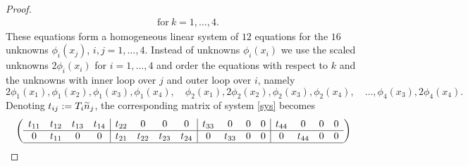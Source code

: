 \documentclass[11pt]{article}
\begin{document}
\begin{proof}
\begin{align}
   \quad\text{for}\ k=1,\ldots,4.
\end{align}
These equations form a homogeneous linear system of $12$ equations for the $16$ unknowns
$\phi_i(x_j)$, $i,j=1,\ldots,4$. Instead of unknowns $\phi_i(x_i)$ we use the scaled unknowns
$2\phi_i(x_i)$ for $i=1,\ldots,4$ and order the equations with respect to $k$ and
the unknowns with inner loop over $j$ and outer loop over $i$, namely
\[
   2\phi_1(x_1), \phi_1(x_2), \phi_1(x_3), \phi_1(x_4),\quad
   \phi_2(x_1), 2\phi_2(x_2), \phi_2(x_3), \phi_2(x_4),\quad\ldots,
   \phi_4(x_3), 2\phi_4(x_4).
\]
Denoting $t_{ij}:=T_i\widetilde n_j$, the corresponding matrix of system \eqref{sys} becomes
\[
   \begin{pmatrix}
   \begin{array}{cccc|cccc|cccc|cccc}
      t_{11} & t_{12} & t_{13} & t_{14} & t_{22} & 0 & 0 & 0 & t_{33} & 0 & 0 & 0 & t_{44} & 0 & 0 & 0 \\\hline
      0 & t_{11} & 0 & 0 & t_{21} & t_{22} & t_{23} & t_{24} & 0 & t_{33} & 0 & 0 & 0 & t_{44} & 0 & 0 \\\hline

\end{array}
\end{pmatrix}\]
\end{proof}
\end{document}
